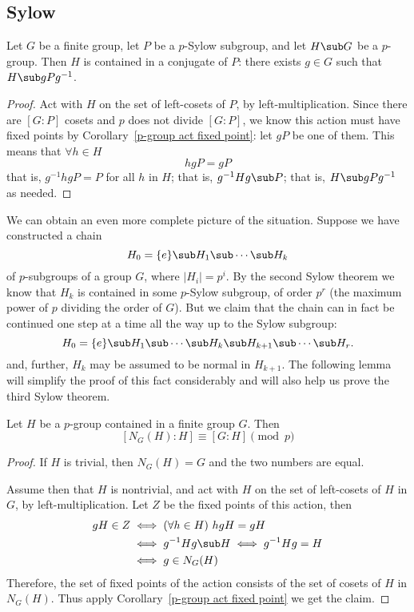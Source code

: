 \subsection{Sylow }
\begin{theorem}
Let $G$ be a finite group, let $P$ be a $p$-Sylow subgroup, and let $H\sub G$ be a $p$-group. Then $H$ is contained in a conjugate of $P$: there exists $g\in G$ such that $H\sub gPg^{-1}$.
\end{theorem}
\begin{proof}
Act with $H$ on the set of left-cosets of $P$, by left-multiplication. Since there are $[G:P]$ cosets and $p$ does not divide $[G:P]$, we know this action must have fixed points by Corollary~\ref{p-group act fixed point}: let $gP$ be one of them. This means that $\forall h\in H$
\[hgP=gP\]
that is, $g^{-1}hgP=P$ for all $h$ in $H$; that is, $g^{-1}Hg\sub P$; that is, $H\sub gPg^{-1}$ as needed.
\end{proof}
We can obtain an even more complete picture of the situation. Suppose we have constructed a chain
\[H_0=\{e\}\sub H_1\sub\cdots\sub H_k\]
of $p$-subgroups of a group $G$, where $|H_i|=p^i$. By the second Sylow theorem we know that $H_k$ is contained in some $p$-Sylow subgroup, of order $p^r$ (the maximum power of $p$ dividing the order of $G$). But we claim that the chain can in fact be continued one step at a time all the way up to the Sylow subgroup:
\[H_0=\{e\}\sub H_1\sub\cdots\sub H_k\sub H_{k+1}\sub\cdots\sub H_r.\]
and, further, $H_k$ may be assumed to be normal in $H_{k+1}$. The following lemma will simplify the proof of this fact considerably and will also help us prove the 
third Sylow theorem.
\begin{lemma}\label{p-group normalizer congruence}
Let $H$ be a $p$-group contained in a finite group $G$. Then
\[[N_G(H):H]\equiv[G:H]\pmod{p}\]
\end{lemma}
\begin{proof}
If $H$ is trivial, then $N_G(H)=G$ and the two numbers are equal.\par
Assume then that $H$ is nontrivial, and act with $H$ on the set of left-cosets of $H$ in $G$, by left-multiplication. Let $Z$ be the fixed points of this action, then 
\begin{align*}
gH\in Z&\iff(\forall h\in H)\ hgH=gH\\
&\iff g^{-1}Hg\sub H\iff g^{-1}Hg=H\\
&\iff g\in N_G(H)
\end{align*}
Therefore, the set of fixed points of the action consists of the set of cosets of $H$ in $N_G(H)$. Thus apply Corollary~\ref{p-group act fixed point} we get the claim.
\end{proof}
